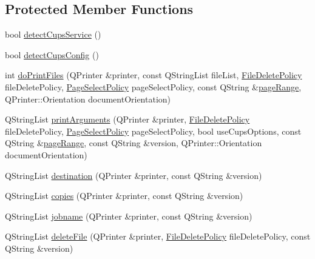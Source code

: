\subsection*{Protected Member Functions}
\begin{DoxyCompactItemize}
\item 
bool \hyperlink{classOkular_1_1FilePrinter_a7510d410004520490730ae51b1aa518c}{detect\+Cups\+Service} ()
\item 
bool \hyperlink{classOkular_1_1FilePrinter_a9b0896c03fc4f23eca75e3f429a3a190}{detect\+Cups\+Config} ()
\item 
int \hyperlink{classOkular_1_1FilePrinter_a4da8a453f83e3047e4e013fdb928bebc}{do\+Print\+Files} (Q\+Printer \&printer, const Q\+String\+List file\+List, \hyperlink{classOkular_1_1FilePrinter_acd01eb48e99f9289a7f4786a366ef7ba}{File\+Delete\+Policy} file\+Delete\+Policy, \hyperlink{classOkular_1_1FilePrinter_a755b647910344031db1d79312482981d}{Page\+Select\+Policy} page\+Select\+Policy, const Q\+String \&\hyperlink{classOkular_1_1FilePrinter_a7a62a72292d1756871321f48446927e3}{page\+Range}, Q\+Printer\+::\+Orientation document\+Orientation)
\item 
Q\+String\+List \hyperlink{classOkular_1_1FilePrinter_a80054323a734e7e56833c887d7e9891e}{print\+Arguments} (Q\+Printer \&printer, \hyperlink{classOkular_1_1FilePrinter_acd01eb48e99f9289a7f4786a366ef7ba}{File\+Delete\+Policy} file\+Delete\+Policy, \hyperlink{classOkular_1_1FilePrinter_a755b647910344031db1d79312482981d}{Page\+Select\+Policy} page\+Select\+Policy, bool use\+Cups\+Options, const Q\+String \&\hyperlink{classOkular_1_1FilePrinter_a7a62a72292d1756871321f48446927e3}{page\+Range}, const Q\+String \&version, Q\+Printer\+::\+Orientation document\+Orientation)
\item 
Q\+String\+List \hyperlink{classOkular_1_1FilePrinter_a2e1a4e95b8546287bf53e7459dfc610e}{destination} (Q\+Printer \&printer, const Q\+String \&version)
\item 
Q\+String\+List \hyperlink{classOkular_1_1FilePrinter_a9713e66fa8a5e4dd92fd426d30e8bfc1}{copies} (Q\+Printer \&printer, const Q\+String \&version)
\item 
Q\+String\+List \hyperlink{classOkular_1_1FilePrinter_a194c38eb766f303f03a74fe6719715b6}{jobname} (Q\+Printer \&printer, const Q\+String \&version)
\item 
Q\+String\+List \hyperlink{classOkular_1_1FilePrinter_aab170418d71766ec305359a1e68e79c9}{delete\+File} (Q\+Printer \&printer, \hyperlink{classOkular_1_1FilePrinter_acd01eb48e99f9289a7f4786a366ef7ba}{File\+Delete\+Policy} file\+Delete\+Policy, const Q\+String \&version)

\end{DoxyCompactItemize}
